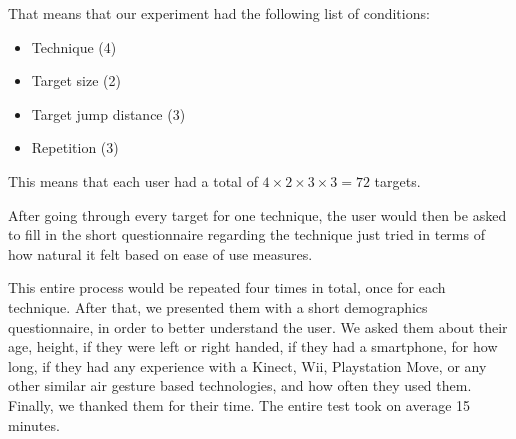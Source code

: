 That means that our experiment had the following list of conditions:
\begin{itemize}
	 \item Technique (4)
	 \item Target size (2)
	 \item Target jump distance (3)
	 \item Repetition (3)
\end{itemize}

This means that each user had a total of $4 \times 2 \times 3 \times 3 = 72 $ targets.

After going through every target for one technique, the user would then be asked to fill in the short questionnaire regarding the technique just tried in terms of how natural it felt based on ease of use measures. 

This entire process would be repeated four times in total, once for each technique. 
After that, we presented them with a short demographics questionnaire, in order to better understand the user. 
We asked them about their age, height, if they were left or right handed, if they had a smartphone, for how long, if they had any experience with a Kinect, Wii, Playstation Move, or any other similar air gesture based technologies, and how often they used them. 
Finally, we thanked them for their time.
The entire test took on average 15 minutes. 
